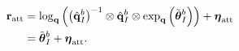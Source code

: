 \begin{align}
  \boldsymbol{\mathrm{r}}_{\text{att}}
                        &= \log_{\boldsymbol{\mathrm{q}}} \left(  \left(
                        \hat{\boldsymbol{\mathrm{q}}}_{I}^b \right)^{-1} \otimes
                        \hat{\boldsymbol{\mathrm{q}}}_{I}^b \otimes \exp_{\boldsymbol{\mathrm{q}}} \left(
                      \tilde{\boldsymbol{\mathrm{\theta}}}_I^b \right) \right)
                          + \boldsymbol{\mathrm{\eta}}_{\text{att}}  \\
                        &= \tilde{\boldsymbol{\mathrm{\theta}}}_I^b
                          + \boldsymbol{\mathrm{\eta}}_{\text{att}}. 
\end{align}

